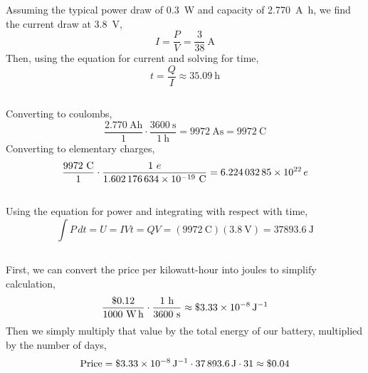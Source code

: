 \documentclass[]{article}
\begin{document}
Assuming the typical power draw of \SI{0.3}{\watt} and capacity of \SI{2.770}{\ampere\hour}, we find the current draw at \SI{3.8}{\volt}, 
\begin{equation}
	I = \frac{P}{V} = \frac{3}{38} \ \si{\ampere}
\end{equation}
Then, using the equation for current and solving for time, 
\begin{equation}
	t = \frac{Q}{I} \approx \SI{35.09}{\hour}
\end{equation}

\subsection{}

Converting to coulombs, 
\begin{equation}
	\frac{2.770 \ \si{\ampere\hour}}{1} \cdot \frac{3600 \ \si{\second}}{1 \ \si{\hour}} = \SI{9972}{\ampere\second} = \SI{9972}{\coulomb}
\end{equation}
Converting to elementary charges, 
\begin{equation}
	\frac{9972 \ \si{\coulomb}}{1} \cdot \frac{1 \ \si{\elementarycharge}}{\num{1.602176634d-19} \ \si{\coulomb}} = \SI{6.22403285d22}{\elementarycharge}
\end{equation}

\subsection{}

Using the equation for power and integrating with respect with time, 
\begin{equation}
	\int P \, dt = U = I V t = QV = (\SI{9972}{\coulomb})(\SI{3.8}{\volt}) = \SI{37893.6}{\joule}
\end{equation}

\subsection{}

First, we can convert the price per kilowatt-hour into joules to simplify calculation, 
\begin{equation}
	\frac{\$0.12}{1000 \ \si{\watt\hour}} \cdot \frac{1 \ \si{\hour}}{3600 \ \si{\second}} \approx \$ \SI{3.33d-8}{\per\joule}
\end{equation}
Then we simply multiply that value by the total energy of our battery, multiplied by the number of days, 
\begin{equation}
	\text{Price} = \$ \SI{3.33d-8}{\per\joule} \cdot \SI{37893.6}{\joule} \cdot 31 \approx \$	0.04
\end{equation}
\end{document}
